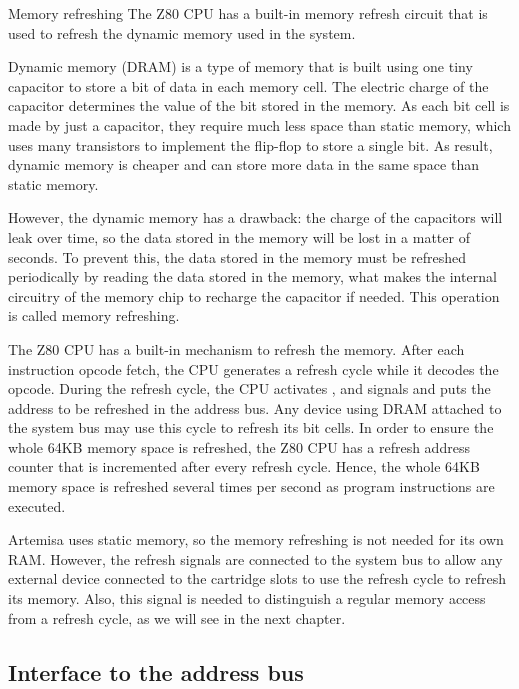 \begin{theory}{Memory refreshing}
    The Z80 CPU has a built-in memory refresh circuit that is used to refresh the dynamic memory
    used in the system. 
    
    Dynamic memory (DRAM) is a type of memory that is built using one tiny capacitor to store a bit
    of data in each memory cell. The electric charge of the capacitor determines the value of the
    bit stored in the memory. As each bit cell is made by just a capacitor, they require much less
    space than static memory, which uses many transistors to implement the flip-flop to store a
    single bit. As result, dynamic memory is cheaper and can store more data in the same space than
    static memory.
    
    However, the dynamic memory has a drawback: the charge of the capacitors will leak over time, so
    the data stored in the memory will be lost in a matter of seconds. To prevent this, the data
    stored in the memory must be refreshed periodically by reading the data stored in the memory,
    what makes the internal circuitry of the memory chip to recharge the capacitor if needed. This
    operation is called memory refreshing.
    
    The Z80 CPU has a built-in mechanism to refresh the memory. After each instruction opcode fetch,
    the CPU generates a refresh cycle while it decodes the opcode. During the refresh cycle, the CPU
    activates ,  and  signals and puts the address to be refreshed in
    the address bus. Any device using DRAM attached to the system bus may use this cycle to refresh
    its bit cells. In order to ensure the whole 64KB memory space is refreshed, the Z80 CPU has a
    refresh address counter that is incremented after every refresh cycle. Hence, the whole 64KB
    memory space is refreshed several times per second as program instructions are executed.

    Artemisa uses static memory, so the memory refreshing is not needed for its own RAM. However,
    the refresh signals are connected to the system bus to allow any external device connected to
    the cartridge slots to use the refresh cycle to refresh its memory. Also, this signal is needed
    to distinguish a regular memory access from a refresh cycle, as we will see in the next chapter.
\end{theory}

\subsection{Interface to the address bus}

